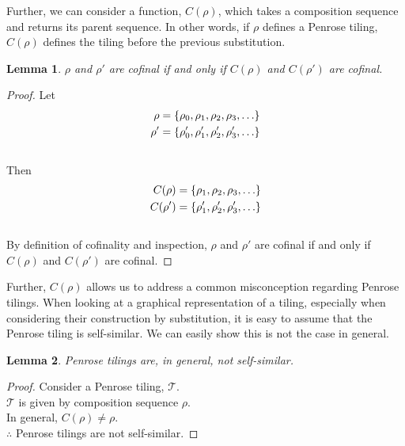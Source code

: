 \documentclass[
  oneside,
  11pt, a4paper,
  footinclude=true,
  headinclude=true,
  cleardoublepage=empty
]{scrbook}
\newtheorem{mylem}{Lemma}
\begin{document}
Further, we can consider a function, $C(\rho)$, which takes a composition sequence and returns its parent sequence. In other words, if $\rho$ defines a Penrose tiling, $C(\rho)$ defines the tiling before the previous substitution. 

\begin{mylem}
$\rho$ and $\rho'$ are cofinal if and only if $C(\rho)$ and $C(\rho')$ are cofinal.
\end{mylem}

\begin{proof}
Let 
\begin{equation*}\begin{split}
\rho=\{\rho_0,\rho_1,\rho_2,\rho_3,\mathellipsis\}\\
\rho'=\{\rho'_0,\rho'_1,\rho'_2,\rho'_3,\mathellipsis\}
\end{split}
\end{equation*}\\
Then 
\begin{equation*}
\begin{split}
C(\rho)=\{\rho_1,\rho_2,\rho_3,\mathellipsis\}\\
C(\rho')=\{\rho'_1,\rho'_2,\rho'_3,\mathellipsis\}
\end{split}
\end{equation*}\\
By definition of cofinality and inspection, $\rho$ and $\rho'$ are cofinal if and only if $C(\rho)$ and $C(\rho')$ are cofinal.
\end{proof}

Further, $C(\rho)$ allows us to address a common misconception regarding Penrose tilings. When looking at a graphical representation of a tiling, especially when considering their construction by substitution, it is easy to assume that the Penrose tiling is self-similar. We can easily show this is not the case in general.

\begin{mylem}
Penrose tilings are, in general, not self-similar.
\end{mylem}

\begin{proof}
Consider a Penrose tiling, $\mathcal{T}$.\\
$\mathcal{T}$ is given by composition sequence $\rho$.\\
In general, $C(\rho)\neq\rho$.\\
$\therefore$ Penrose tilings are not self-similar.
\end{proof}
\end{document}
